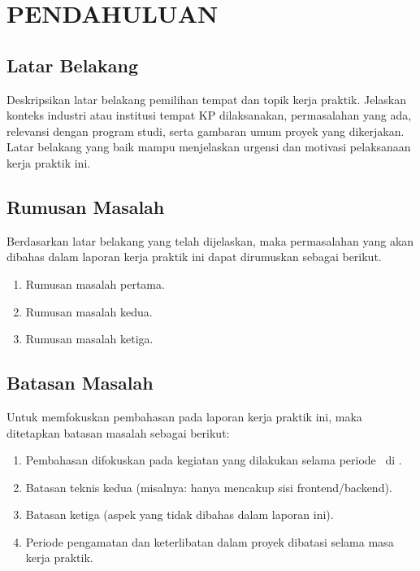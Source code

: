 \chapter{PENDAHULUAN}

\section{Latar Belakang}

Deskripsikan latar belakang pemilihan tempat dan topik kerja praktik. Jelaskan
konteks industri atau institusi tempat KP dilaksanakan, permasalahan yang ada,
relevansi dengan program studi, serta gambaran umum proyek yang dikerjakan.
Latar belakang yang baik mampu menjelaskan urgensi dan motivasi pelaksanaan
kerja praktik ini.

\section{Rumusan Masalah}

Berdasarkan latar belakang yang telah dijelaskan, maka permasalahan yang akan
dibahas dalam laporan kerja praktik ini dapat dirumuskan sebagai berikut.

\begin{enumerate}[label=\alph*., leftmargin=*, itemsep=0pt]
  \item Rumusan masalah pertama.
  \item Rumusan masalah kedua.
  \item Rumusan masalah ketiga.
\end{enumerate}

\section{Batasan Masalah}

Untuk memfokuskan pembahasan pada laporan kerja praktik ini, maka ditetapkan
batasan masalah sebagai berikut:

\begin{enumerate}[label=\alph*., leftmargin=*, itemsep=0pt]
  \item Pembahasan difokuskan pada kegiatan yang dilakukan selama periode
        \PeriodeKP\ di \NamaPerusahaan.
  \item Batasan teknis kedua (misalnya: hanya mencakup sisi frontend/backend).
  \item Batasan ketiga (aspek yang tidak dibahas dalam laporan ini).
  \item Periode pengamatan dan keterlibatan dalam proyek dibatasi selama masa
        kerja praktik.
\end{enumerate}

